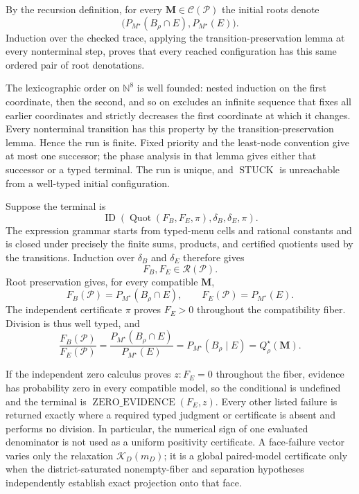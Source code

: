 By the recursion definition, for every \(\mathbf M\in\mathcal C(\mathcal P)\) the initial roots denote
\[
\bigl(P_{M^\star}(B_\rho\cap E),P_{M^\star}(E)\bigr).
\]
Induction over the checked trace, applying the transition-preservation lemma at every nonterminal step, proves that every reached configuration has this same ordered pair of root denotations.

The lexicographic order on \(\mathbb N^8\) is well founded: nested induction on the first coordinate, then the second, and so on excludes an infinite sequence that fixes all earlier coordinates and strictly decreases the first coordinate at which it changes. Every nonterminal transition has this property by the transition-preservation lemma. Hence the run is finite. Fixed priority and the least-node convention give at most one successor; the phase analysis in that lemma gives either that successor or a typed terminal. The run is unique, and \(\operatorname{STUCK}\) is unreachable from a well-typed initial configuration.

Suppose the terminal is
\[
\operatorname{ID}(\operatorname{Quot}(F_B,F_E,\pi),\delta_B,\delta_E,\pi).
\]
The expression grammar starts from typed-menu cells and rational constants and is closed under precisely the finite sums, products, and certified quotients used by the transitions. Induction over \(\delta_B\) and \(\delta_E\) therefore gives
\[
F_B,F_E\in\mathscr R(\mathcal P).
\]
Root preservation gives, for every compatible \(\mathbf M\),
\[
F_B(\mathcal P)=P_{M^\star}(B_\rho\cap E),
\qquad
F_E(\mathcal P)=P_{M^\star}(E).
\]
The independent certificate \(\pi\) proves \(F_E>0\) throughout the compatibility fiber. Division is thus well typed, and
\[
\frac{F_B(\mathcal P)}{F_E(\mathcal P)}
=\frac{P_{M^\star}(B_\rho\cap E)}{P_{M^\star}(E)}
=P_{M^\star}(B_\rho\mid E)
=Q_\rho^\star(\mathbf M).
\]

If the independent zero calculus proves \(z:F_E=0\) throughout the fiber, evidence has probability zero in every compatible model, so the conditional is undefined and the terminal is \(\operatorname{ZERO\_EVIDENCE}(F_E,z)\). Every other listed failure is returned exactly where a required typed judgment or certificate is absent and performs no division. In particular, the numerical sign of one evaluated denominator is not used as a uniform positivity certificate. A face-failure vector varies only the relaxation \(\mathcal K_D(m_D)\); it is a global paired-model certificate only when the district-saturated nonempty-fiber and separation hypotheses independently establish exact projection onto that face.